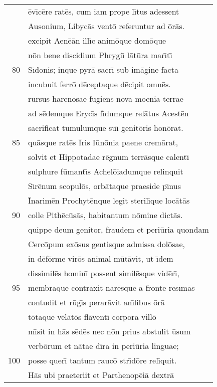 \documentclass[paper=6in:9in,pagesize=pdftex,
               headinclude=on,footinclude=on,12pt]{scrbook}
\begin{document}
\begin{longtable}[p]{ r l }
 & \=ev\={\i}c\=ere rat\=es, cum iam prope l\={\i}tus adessent\\ 
 & Ausonium, Libyc\=as vent\=o referuntur ad \=or\=as.\\ 
 & excipit Aen\=e\=an ill\={\i}c anim\=oque dom\=oque\\ 
 & n\=on bene discidium Phrygi\={\i} l\=at\=ura mar\={\i}t\={\i}\\ 
80 & S\={\i}donis; inque pyr\=a sacr\={\i} sub im\=agine facta\\ 
 & incubuit ferr\=o d\=eceptaque d\=ecipit omn\=es.\\ 
 & r\=ursus har\=en\=osae fugi\=ens nova moenia terrae\\ 
 & ad s\=edemque Eryc\={\i}s f\={\i}dumque rel\=atus Acest\=en\\ 
 & sacrificat tumulumque su\={\i} genit\=oris hon\=orat.\\ 
85 & qu\=asque rat\=es \=Iris I\=un\=onia paene crem\=arat,\\ 
 & solvit et Hippotadae r\=egnum terr\=asque calent\={\i}\\ 
 & sulphure f\=umant\={\i}s Achel\=oiadumque relinquit\\ 
 & S\={\i}r\=enum scopul\=os, orb\=ataque praeside p\={\i}nus\\ 
 & \=Inarim\=en Prochyt\=enque legit steril\={\i}que loc\=at\=as\\ 
90 & colle Pith\=ec\=us\=as, habitantum n\=omine dict\=as.\\ 
 & quippe deum genitor, fraudem et peri\=uria quondam\\ 
 & Cerc\=opum ex\=osus gentisque admissa dol\=osae,\\ 
 & in d\=ef\=orme vir\=os animal m\=ut\=avit, ut \={\i}dem\\ 
 & dissimil\=es homin\={\i} possent simil\=esque vid\=er\={\i},\\ 
95 & membraque contr\=axit n\=ar\=esque \=a fronte res\={\i}m\=as\\ 
 & contudit et r\=ug\={\i}s perar\=avit an\={\i}libus \=or\=a\\ 
 & t\=otaque v\=el\=at\=os fl\=avent\={\i} corpora vill\=o\\ 
 & m\={\i}sit in h\=as s\=ed\=es nec n\=on prius abstulit \=usum\\ 
 & verb\=orum et n\=atae d\={\i}ra in peri\=uria linguae;\\ 
100 & posse quer\={\i} tantum rauc\=o str\={\i}d\=ore rel\={\i}quit.\\ 
 & \indent H\=as ubi praeteriit et Parthenop\=ei\=a dextr\=a\\ 

\end{longtable}
\end{document}
